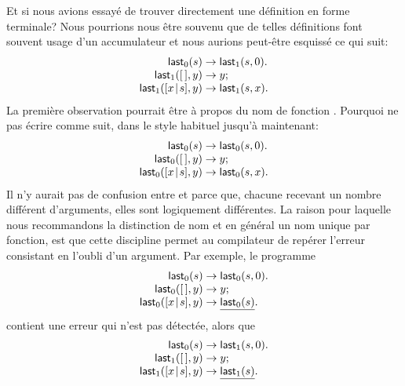 Et si nous avions essayé de trouver directement une définition en
forme terminale? Nous pourrions nous être souvenu que de telles
définitions font souvent usage d'un accumulateur et nous aurions
peut-être esquissé ce qui suit:
\begin{equation*}
\begin{array}{r@{\;}c@{\;}l}
\fun{last}_0(s) & \rightarrow & \fun{last}_1(s,0).\\
\fun{last}_1(\el,y) & \rightarrow & y;\\
\fun{last}_1(\cons{x}{s},y) & \rightarrow & \fun{last}_1(s,x).
\end{array}
\end{equation*}
La première observation pourrait être à propos du nom de fonction
. Pourquoi ne pas écrire comme suit, dans le style
habituel jusqu'à maintenant:
\begin{equation*}
\begin{array}{r@{\;}c@{\;}l}
\fun{last}_0(s) & \rightarrow & \fun{last}_0(s,0).\\
\fun{last}_0(\el,y) & \rightarrow & y;\\
\fun{last}_0(\cons{x}{s},y) & \rightarrow & \fun{last}_0(s,x).
\end{array}
\end{equation*}
Il n'y aurait pas de confusion entre  et
 parce que, chacune recevant un nombre différent
d'arguments, elles sont logiquement différentes. La raison pour
laquelle nous recommandons la distinction de nom et en général un nom
unique par fonction, est que cette discipline permet au compilateur de
repérer l'erreur consistant en l'oubli d'un argument. Par exemple, le
programme
\begin{equation*}
\begin{array}{r@{\;}c@{\;}l}
\fun{last}_0(s) & \rightarrow & \fun{last}_0(s,0).\\
\fun{last}_0(\el,y) & \rightarrow & y;\\
\fun{last}_0(\cons{x}{s},y) & \rightarrow &
\underline{\fun{last}_0(s)}.
\end{array}
\end{equation*}
contient une erreur qui n'est pas détectée, alors que
\begin{equation*}
\begin{array}{r@{\;}c@{\;}l}
\fun{last}_0(s) & \rightarrow & \fun{last}_1(s,0).\\
\fun{last}_1(\el,y) & \rightarrow & y;\\
\fun{last}_1(\cons{x}{s},y) & \rightarrow &
\underline{\fun{last}_1(s)}.
\end{array}
\end{equation*}
